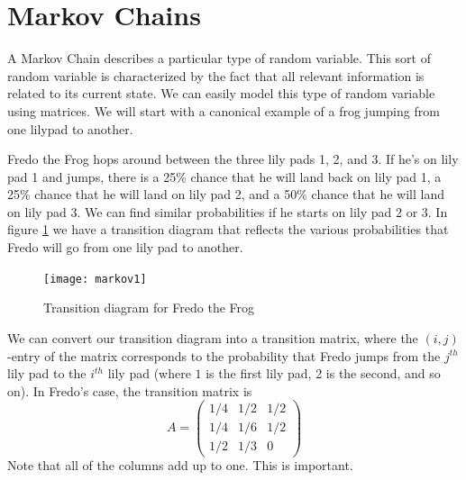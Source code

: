 \label{lab:MarkovGraph}


\section*{Markov Chains}


A Markov Chain describes a particular type of random variable.
This sort of random variable is characterized by the fact that all relevant information is related to its current state.
We can easily model this type of random variable using matrices.
We will start with a canonical example of a frog jumping from one lilypad to another.

Fredo the Frog hops around between the three lily pads 1, 2, and 3.
If he's on lily pad 1 and jumps, there is a 25\% chance that he will land back on lily pad 1, a 25\% chance that he will land on lily pad 2, and a 50\% chance that he will land on lily pad 3.
We can find similar probabilities if he starts on lily pad 2 or 3.
In figure \ref{markov1} we have a transition diagram that reflects the various probabilities that Fredo will go from one lily pad to another.

\begin{figure}[h!]
\begin{center}
\texttt{[image: markov1]}
\end{center}
\caption{Transition diagram for Fredo the Frog}
\label{markov1}
\end{figure}

We can convert our transition diagram into a transition matrix, where the $(i,j)$-entry of the matrix corresponds to the probability that Fredo jumps from the $j^{th}$ lily pad to the $i^{th}$ lily pad (where $1$ is the first lily pad, 2 is the second, and so on).
In Fredo's case, the transition matrix is
\[
A = \begin{pmatrix}
1/4 & 1/2 & 1/2\\
1/4 & 1/6 & 1/2\\
1/2 & 1/3 & 0
\end{pmatrix}
\]
Note that all of the columns add up to one.
This is important.

